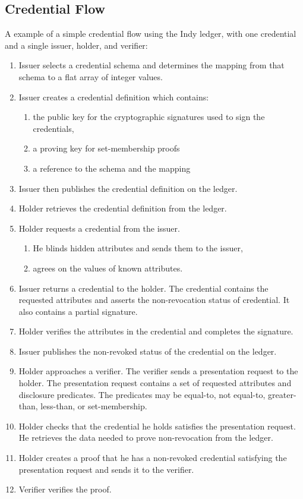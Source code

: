 \documentclass[a4paper]{article}
\begin{document}
\subsection{Credential Flow}
A example of a simple credential flow using the Indy ledger, with one credential and a single issuer, holder, and verifier:
\begin{enumerate}
    \item Issuer selects a credential schema and determines the mapping from that schema to a flat array of integer values.
    \item Issuer creates a credential definition which contains:
    \begin{enumerate}
        \item the public key for the cryptographic signatures used to sign the credentials, 
        \item a proving key for set-membership proofs
        \item a reference to the schema and the mapping
    \end{enumerate}
    \item Issuer then publishes the credential definition on the ledger. 
    \item Holder retrieves the credential definition from the ledger.
    \item Holder requests a credential from the issuer. 
    \begin{enumerate}
        \item He blinds hidden attributes and sends them to the issuer,
        \item agrees on the values of known attributes.
    \end{enumerate}
    \item Issuer returns a credential to the holder. The credential contains the requested attributes and asserts the non-revocation status of credential. It also contains a partial signature.
    \item Holder verifies the attributes in the credential and completes the signature.
    \item Issuer publishes the non-revoked status of the credential on the ledger.
    \item Holder approaches a verifier. The verifier sends a presentation request to the holder. The presentation request contains a set of requested attributes and disclosure predicates. 
    The predicates may be equal-to, not equal-to, greater-than, less-than, or set-membership.
    \item Holder checks that the credential he holds satisfies the presentation request. 
    He retrieves the data needed to prove non-revocation from the ledger.
    \item Holder creates a proof that he has a non-revoked credential satisfying the presentation request and sends it to the verifier.
    \item Verifier verifies the proof.
\end{enumerate}
\end{document}
